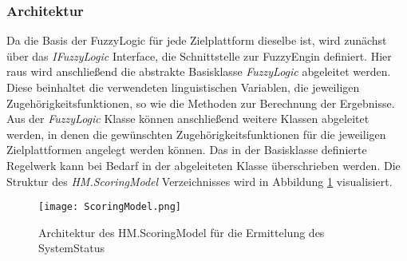 \subsubsection*{Architektur}
Da die Basis der FuzzyLogic für jede Zielplattform dieselbe ist, wird zunächst über das \textit{IFuzzyLogic} Interface, die Schnittstelle zur FuzzyEngin definiert. Hier raus wird anschließend die abstrakte Basisklasse \textit{FuzzyLogic} abgeleitet werden. Diese beinhaltet die verwendeten linguistischen Variablen, die jeweiligen Zugehörigkeitsfunktionen, so wie die Methoden zur Berechnung der Ergebnisse.\\
Aus der \textit{FuzzyLogic} Klasse können anschließend weitere Klassen abgeleitet werden, in denen die gewünschten Zugehörigkeitsfunktionen für die jeweiligen Zielplattformen angelegt werden können. Das in der Basisklasse definierte Regelwerk kann bei Bedarf in der abgeleiteten Klasse überschrieben werden. Die Struktur des \textit{HM.ScoringModel} Verzeichnisses wird in Abbildung \ref{fig:ScoringModel} visualisiert.  
\begin{center}
    \begin{figure}[h!]
        \centering
        \texttt{[image: ScoringModel.png]}
        \caption{Architektur des HM.ScoringModel für die Ermittelung des SystemStatus}
        \label{fig:ScoringModel}
    \end{figure}
\end{center}

